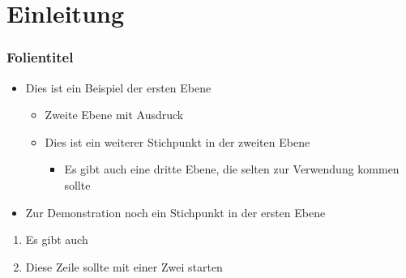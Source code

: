 \section{Einleitung}


\begin{frame}
	\frametitle{Folientitel}
	
		\begin{itemize}
 			\item Dies ist ein Beispiel der ersten Ebene
 			\begin{itemize}
	 			\item Zweite Ebene mit  Ausdruck
	 			\item Dies ist ein weiterer Stichpunkt in der zweiten Ebene
	 			\begin{itemize}
		 			\item Es gibt auch eine dritte Ebene, die selten zur Verwendung kommen sollte
	 			\end{itemize}
 			\end{itemize}
 			\item Zur Demonstration noch ein Stichpunkt in der ersten Ebene
 		\end{itemize}
 		
 		\begin{enumerate}
 		\item Es gibt auch 
 		\item Diese Zeile sollte mit einer Zwei starten
 		\end{enumerate}
 		
\end{frame}



